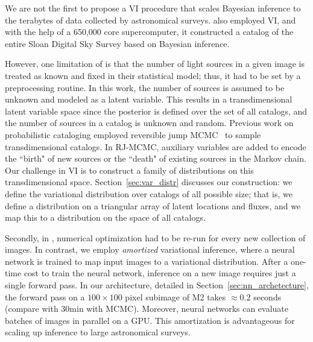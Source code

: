 We are not the first to propose a VI procedure
that scales Bayesian inference to the terabytes of data collected by astronomical surveys. 
\cite{regier2019_celeste} also employed 
VI, and with the help of a 650,000 core supercomputer, it constructed a catalog of the entire Sloan Digital Sky Survey based on Bayesian inference. 

However, one limitation of \cite{regier2019_celeste} is that the number of light sources in a given image is treated as known and fixed in their statistical model; thus, it had to be set by a preprocessing routine. In this work, the number of sources is assumed to be unknown and modeled as a latent variable. 
This results in a transdimensional latent variable space 
since the posterior is defined over the set of all catalogs, and the number of sources in a catalog is unknown and random.
Previous work on probabilistic cataloging employed reversible jump MCMC~\cite{Green95reversiblejump} to sample transdimensional catalogs. In RJ-MCMC, auxiliary variables are added to encode the ``birth" of new sources 
or the ``death" of existing sources in the Markov chain. Our challenge in VI is to construct a family of distributions on this transdimensional space. Section~\ref{sec:var_distr} discusses our construction: we define the variational distribution over catalogs of all possible size; that is, we define a distribution on a triangular array of latent locations and fluxes, and we map this to a distribution 
on the space of all catalogs.

Secondly, in \cite{regier2019_celeste}, numerical optimization had to be re-run for every new collection of images. 
In contrast, we employ {\itshape amortized} variational inference, where a neural network is trained to map input images to a variational distribution. After a one-time cost to train the neural network, inference 
on a new image requires just a single forward pass. In our 
architecture, detailed in Section~\ref{sec:nn_archetecture}, the forward pass on 
a $100 \times 100$ pixel subimage of M2 takes $\approx 0.2$ seconds (compare with 30min with MCMC). Moreover, neural networks can evaluate batches of images in parallel on a GPU. This amortization is advantageous for scaling up inference to large astronomical surveys.

